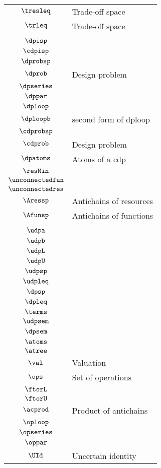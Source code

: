 \begin{longtable}{cl}
 $\tresleq$ &  Trade-off space\\ 
 $\trleq$ &  Trade-off space\\ 
 \multicolumn{2}{l}{}\\ 
 \hline
$\dpisp$ & \\ 
 $\cdpisp$ & \\ 
 $\dprobsp$ & \\ 
 $\dprob$ &  Design problem\\ 
 $\dpseries$ & \\ 
 $\dppar$ & \\ 
 $\dploop$ & \\ 
 $\dploopb$ &  second form of dploop\\ 
 $\cdprobsp$ & \\ 
 $\cdprob$ &  Design problem\\ 
 $\dpatoms$ &  Atoms of a cdp\\ 
 $\resMin$ & \\ 
 $\unconnectedfun$ & \\ 
 $\unconnectedres$ & \\ 
 $\Aressp$ &  Antichains of resources\\ 
 $\Afunsp$ &  Antichains of functions\\ 
 \multicolumn{2}{l}{}\\ 
 \hline
$\udpa$ & \\ 
 $\udpb$ & \\ 
 $\udpL$ & \\ 
 $\udpU$ & \\ 
 $\udpsp$ & \\ 
 $\udpleq$ & \\ 
 $\dpsp$ & \\ 
 $\dpleq$ & \\ 
 $\terms$ & \\ 
 $\udpsem$ & \\ 
 $\dpsem$ & \\ 
 $\atoms$ & \\ 
 $\atree$ & \\ 
 $\val$ &  Valuation\\ 
 $\ops$ &  Set of operations\\ 
 $\ftorL$ & \\ 
 $\ftorU$ & \\ 
 $\acprod$ &  Product of antichains\\ 
 $\oploop$ & \\ 
 $\opseries$ & \\ 
 $\oppar$ & \\ 
 $\UId$ &  Uncertain identity\\ 

\end{longtable}
